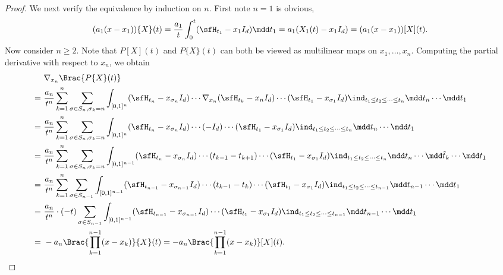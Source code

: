 \documentclass[11pt]{article}
\begin{document}
\begin{proof}
%
We next verify the equivalence by induction on $n$. First note $n=1$ is obvious, 
\[
    (a_1(x-x_1)) \{X\} (t) = \frac{a_1}{t} \int_0^t (\sfH_{t_1} - x_1 I_d) \mdd t_1 = a_1 ( X_1(t) - x_1 I_d ) = (a_1(x-x_1)) [X] (t).
\]
Now consider $n\ge 2$. Note that $P[X](t)$ and $P\{X\}(t)$ can both be viewed as multilinear maps on $x_1,\dots,x_n$. Computing the partial derivative with respect to $x_n$, we obtain
{\small
\begin{align*}
    & \nabla_{x_n} \Brac{ P\{X\}(t) } \\
    =~& \frac{a_n}{t^n} \sum_{k=1}^n \sum_{\sigma\in S_n, \sigma_k = n} \int_{[0,1]^n} (\sfH_{t_n} - x_{\sigma_n} I_d) \cdots \nabla_{x_n} (\sfH_{t_k} - x_n I_d) \cdots (\sfH_{t_1} - x_{\sigma_1} I_d) \ind_{t_1\le t_2 \le \cdots \le t_n} \mdd t_n \cdots \mdd t_1 \\
    =~& \frac{a_n}{t^n} \sum_{k=1}^n \sum_{\sigma\in S_n, \sigma_k = n} \int_{[0,1]^n} (\sfH_{t_n} - x_{\sigma_n} I_d) \cdots (- I_d) \cdots (\sfH_{t_1} - x_{\sigma_1} I_d) \ind_{t_1\le t_2 \le \cdots \le t_n} \mdd t_n \cdots \mdd t_1 \\
    =~& \frac{a_n}{t^n} \sum_{k=1}^n \sum_{\sigma\in S_n, \sigma_k = n} \int_{[0,1]^{n-1}} (\sfH_{t_n} - x_{\sigma_n} I_d) \cdots ( t_{k-1} - t_{k+1} ) \cdots (\sfH_{t_1} - x_{\sigma_1} I_d) \ind_{t_1\le t_2 \le \cdots \le t_n} \mdd t_n \cdots \mdd \hat{t}_k \cdots \mdd t_1 \\
    =~& \frac{a_n}{t^n} \sum_{k=1}^n \sum_{\sigma \in S_{n-1}} \int_{[0,1]^{n-1}} (\sfH_{t_{n-1}} - x_{\sigma_{n-1}} I_d) \cdots ( t_{k-1} - t_k ) \cdots (\sfH_{t_1} - x_{\sigma_1} I_d) \ind_{t_1\le t_2 \le \cdots \le t_{n-1}} \mdd t_{n-1} \cdots \mdd t_1 \\
    =~& \frac{a_n}{t^n} \cdot (- t) \sum_{\sigma \in S_{n-1}} \int_{[0,1]^{n-1}} (\sfH_{t_{n-1}} - x_{\sigma_{n-1}} I_d) \cdots (\sfH_{t_1} - x_{\sigma_1} I_d) \ind_{t_1\le t_2 \le \cdots \le t_{n-1}} \mdd t_{n-1} \cdots \mdd t_1 \\
    =~& - a_n \Brac{ \prod_{k=1}^{n-1} (x-x_k) } \{X\}(t) = - a_n \Brac{ \prod_{k=1}^{n-1} (x-x_k) } [X](t).
\end{align*}}


\end{proof}
\end{document}
